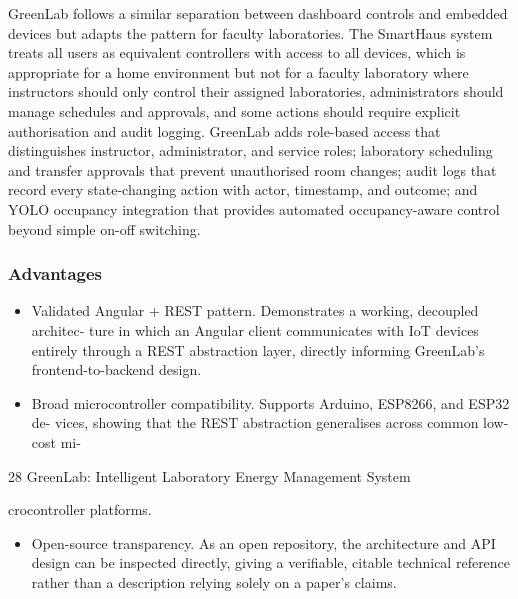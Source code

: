 GreenLab follows a similar separation between dashboard controls and embedded
devices but adapts the pattern for faculty laboratories. The SmartHaus system treats all
users as equivalent controllers with access to all devices, which is appropriate for a home
environment but not for a faculty laboratory where instructors should only control their
assigned laboratories, administrators should manage schedules and approvals, and some
actions should require explicit authorisation and audit logging. GreenLab adds role-based
access that distinguishes instructor, administrator, and service roles; laboratory scheduling
and transfer approvals that prevent unauthorised room changes; audit logs that record every
state-changing action with actor, timestamp, and outcome; and YOLO occupancy integration that provides automated occupancy-aware control beyond simple on-off switching.



\subsubsection*{Advantages}


\begin{itemize}
  \item Validated Angular + REST pattern. Demonstrates a working, decoupled architec-
ture in which an Angular client communicates with IoT devices entirely through a
REST abstraction layer, directly informing GreenLab's frontend-to-backend design.
\end{itemize}

\begin{itemize}
  \item Broad microcontroller compatibility. Supports Arduino, ESP8266, and ESP32 de-
vices, showing that the REST abstraction generalises across common low-cost mi-
\end{itemize}

28
GreenLab: Intelligent Laboratory Energy Management System


crocontroller platforms.

\begin{itemize}
  \item Open-source transparency. As an open repository, the architecture and API design
can be inspected directly, giving a veriﬁable, citable technical reference rather than a
description relying solely on a paper's claims.
\end{itemize}



